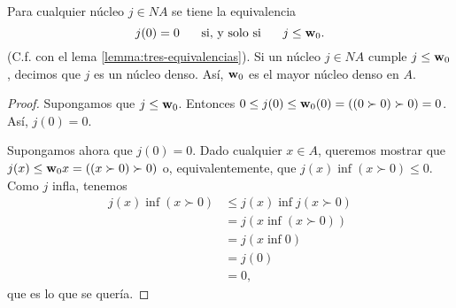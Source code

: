 \begin{lemma}%
  \label{lemma:nucleos-densos}
  Para cualquier núcleo $j\in NA$ se tiene la equivalencia
  \[
    j(0)=0 \hspace{5mm}\text{ si, y solo si }\hspace{5mm} j\leq \mathbf w_{0}
  .\]
  (C.f. con el lema \ref{lemma:tres-equivalencias}).
  Si un núcleo $j\in NA$ cumple $j\leq\mathbf w_{0}$,
  decimos que $j$ es un núcleo denso.
  Así, $\mathbf w_{0}$ es el mayor núcleo denso en $A$.
\end{lemma}
\begin{proof}
    Supongamos que $j\leq \mathbf w_{0}$.
    Entonces $0\leq j(0)\leq \mathbf w_{0}(0)=((0\succ 0)\succ 0)=0$. Así, $j(0)=0$.

    Supongamos ahora que $j(0)=0$.
    Dado cualquier $x\in A$, queremos mostrar que $j(x)\leq\mathbf w_{0} x=((x\succ 0)\succ 0)$ o, equivalentemente, que
    $j(x)\inf(x\succ 0)\leq 0$.
    Como $j$ infla, tenemos
    \begin{align*}
      j(x)\inf(x\succ 0)
      &\leq j(x)\inf j(x\succ 0) \\
      &= j(x\inf (x\succ 0)) \\
      &= j(x\inf 0) \\
      &= j(0) \\
      &= 0,
    \end{align*}
    que es lo que se quería.
\end{proof}

